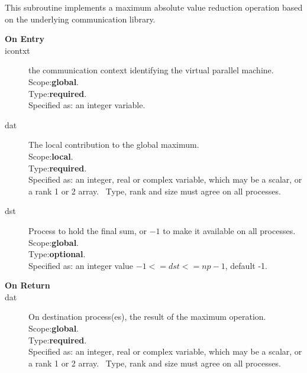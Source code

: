 This subroutine implements a maximum absolute value reduction
operation based on the underlying communication library. 
\begin{description}
\item[\bf  On Entry ]
\item[icontxt] the communication context identifying the virtual
  parallel machine.\\
Scope:{\bf global}.\\
Type:{\bf required}.\\
Specified as: an integer variable.
\item[dat] The local contribution to the global maximum.\\
Scope:{\bf local}.\\
Type:{\bf required}.\\
Specified as: an integer, real or complex variable, which may be a
scalar, or a rank 1 or 2 array. \
Type, rank and size must agree on all processes.
\item[dst] Process to hold the final sum, or $-1$ to make it available
  on all processes.\\
Scope:{\bf global}.\\
Type:{\bf optional}.\\
Specified as: an integer value $-1<= dst <= np-1$, default -1. \\
\end{description}


\begin{description}
\item[\bf On Return]
\item[dat] On destination process(es), the result of the maximum operation.\\
Scope:{\bf global}.\\
Type:{\bf required}.\\
Specified as: an integer, real or complex variable, which may be a
scalar, or a rank 1 or 2 array. \
Type, rank and size must agree on all processes.
\end{description}



